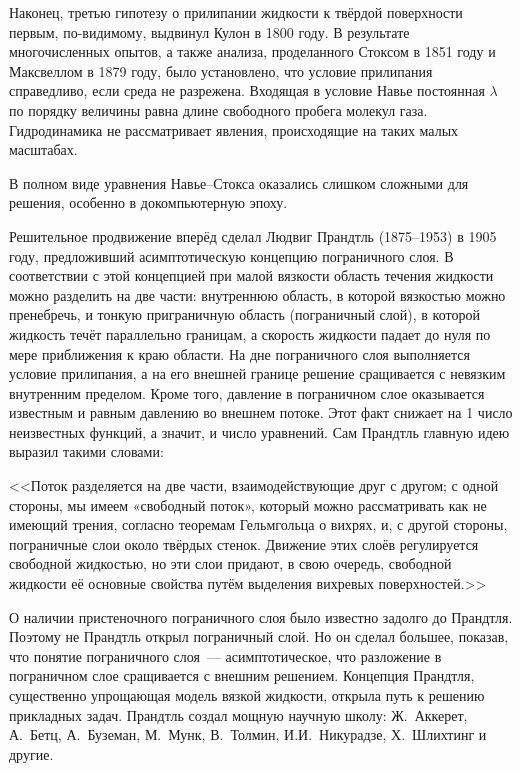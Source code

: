 Наконец, третью гипотезу о прилипании жидкости к твёрдой поверхности первым, по-видимому, выдвинул Кулон в 
1800 году. В результате многочисленных опытов, а также анализа, проделанного Стоксом в 1851 году и 
Максвеллом в 1879 году, было установлено, что условие прилипания справедливо, если среда не разрежена. 
Входящая в условие Навье постоянная $\lambda$ по порядку величины равна длине свободного пробега молекул 
газа. Гидродинамика не рассматривает явления, происходящие на таких малых масштабах.

В полном виде уравнения Навье--Стокса оказались слишком сложными для решения, особенно в докомпьютерную эпоху.

Решительное продвижение вперёд сделал Людвиг Прандтль (1875--1953) в 1905 году, предложивший асимптотическую 
концепцию пограничного слоя. В соответствии с этой концепцией при малой вязкости область течения жидкости
 можно разделить на две части: внутреннюю область, в которой вязкостью можно пренебречь, и тонкую приграничную
  область (пограничный слой), в которой жидкость течёт параллельно границам, а скорость жидкости падает до 
  нуля по мере приближения к краю области. На дне пограничного слоя выполняется условие прилипания, а на его 
  внешней границе решение сращивается с невязким внутренним пределом. Кроме того, давление в пограничном 
  слое оказывается известным и равным давлению во внешнем потоке. Этот факт снижает на 1 число неизвестных 
  функций, а значит, и число уравнений. Сам Прандтль главную идею выразил такими словами:

<<Поток разделяется на две части, взаимодействующие друг с другом; с одной стороны, мы имеем «свободный поток», 
который можно рассматривать как не имеющий трения, согласно теоремам Гельмгольца о вихрях, и, с другой стороны, 
пограничные слои около твёрдых стенок. Движение этих слоёв регулируется свободной жидкостью, но эти слои придают,
в свою очередь, свободной жидкости её основные свойства путём выделения вихревых поверхностей.>>

О наличии пристеночного пограничного слоя было известно задолго до Прандтля. Поэтому не Прандтль открыл 
пограничный слой. Но он сделал большее, показав, что понятие пограничного слоя~--- асимптотическое, что 
разложение в пограничном слое сращивается с внешним решением. Концепция Прандтля, существенно упрощающая 
модель вязкой жидкости, открыла путь к решению прикладных задач. Прандтль создал мощную научную школу: 
Ж.~Аккерет, А.~Бетц, А.~Буземан, М.~Мунк, В.~Толмин, И.И.~Никурадзе, Х.~Шлихтинг и другие.

